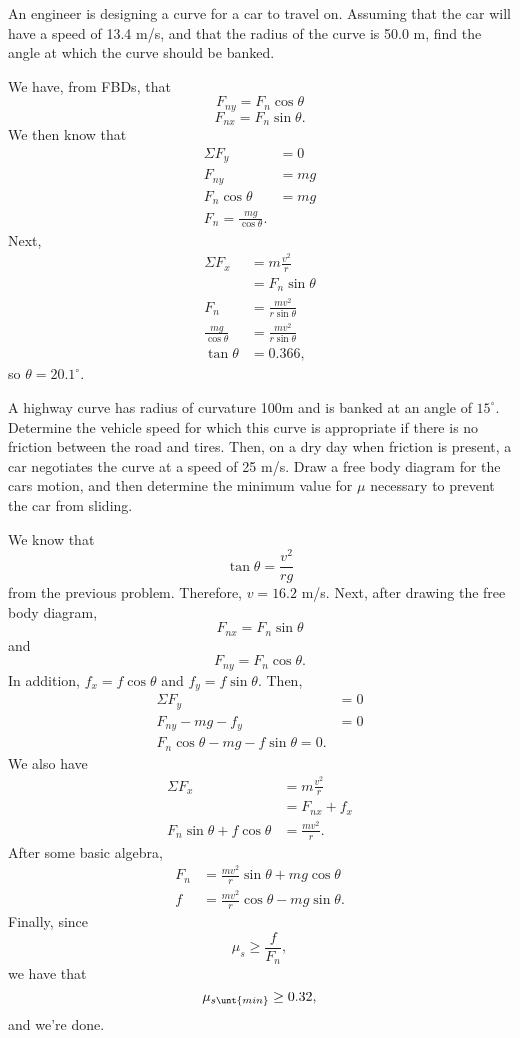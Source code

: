 \documentclass[11pt]{article}
\begin{document}
\begin{example}
	An engineer is designing a curve for a car to travel on. Assuming that the car will have a speed of 13.4 m/s, and that the radius of the curve is 50.0 m, find the angle at which the curve should be banked.
\end{example}
\begin{solution}
	We have, from FBDs, that
	\[F_{ny} = F_n\cos\theta\]
	\[F_{nx} = F_n\sin\theta.\]
	We then know that
	\begin{align*}
		\Sigma F_y &= 0 \\
		F_{ny} &= mg \\
		F_n\cos\theta &= mg \\
		F_n = \frac{mg}{\cos\theta}.
	\end{align*}
	Next,
	\begin{align*}
		\Sigma F_x &= m\frac{v^2}{r} \\
		&= F_n\sin\theta \\
		F_n &= \frac{mv^2}{r\sin\theta} \\
		\frac{mg}{\cos\theta} &= \frac{mv^2}{r\sin\theta} \\
		\tan\theta &= 0.366,
	\end{align*}
	so $\theta = 20.1^{\circ}$.
\end{solution}

\begin{example}[AP 1988 \#1]
	A highway curve has radius of curvature 100m and is banked at an angle of $15^{\circ}$. Determine the vehicle speed for which this curve is appropriate if there is no friction between the road and tires. Then, on a dry day when friction is present, a car negotiates the curve at a speed of 25 m/s. Draw a free body diagram for the cars motion, and then determine the minimum value for $\mu$ necessary to prevent the car from sliding.
\end{example}
\begin{solution}
	We know that
	\[\tan\theta = \frac{v^2}{rg}\]
	from the previous problem. Therefore, $v = 16.2$ m/s. Next, after drawing the free body diagram,
	\[F_{nx} = F_n\sin\theta\]
	and
	\[F_{ny} = F_n\cos\theta.\]
	In addition, $f_x = f\cos\theta$ and $f_y = f\sin\theta$. Then,
	\begin{align*}
		\Sigma F_y &= 0 \\
		F_{ny} - mg - f_y &= 0 \\
		F_n\cos\theta - mg - f\sin\theta = 0.
	\end{align*}
	We also have
	\begin{align*}
		\Sigma F_x &= m\frac{v^2}{r} \\
		&= F_{nx} + f_x \\
		F_n\sin\theta + f\cos\theta &= \frac{mv^2}{r}.
	\end{align*}
	After some basic algebra,
	\begin{align*}
		F_n &= \frac{mv^2}{r}\sin\theta + mg\cos\theta \\
		f &= \frac{mv^2}{r}\cos\theta - mg\sin\theta.
	\end{align*}
	Finally, since
	\[\mu_s \geq \frac{f}{F_n},\]
	we have that
	\[\mu_{s\unt{min}} \geq 0.32,\]
	and we're done.
\end{solution}
\end{document}
